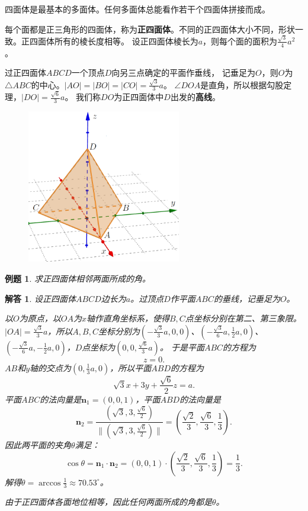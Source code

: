 \documentclass[12pt,UTF8]{ctexbook}
\newtheorem{et}{例题}[section]
\newtheorem*{so}{解答}
\begin{document}
四面体是最基本的多面体。任何多面体总能看作若干个四面体拼接而成。

每个面都是正三角形的四面体，称为\textbf{正四面体}。不同的正四面体大小不同，形状一致。正四面体所有的棱长度相等。
设正四面体棱长为$a$，则每个面的面积为$\frac{\sqrt{3}}{4}a^2$。

过正四面体$ABCD$一个顶点$D$向另三点确定的平面作垂线，
记垂足为$O$，则$O$为$\triangle ABC$的中心。$|AO|=|BO|=|CO|=\frac{\sqrt{3}}{3}a$。
$\angle DOA$是直角，所以根据勾股定理，$|DO| = \frac{\sqrt{6}}{3}a$。
我们称$DO$为正四面体中$D$出发的\textbf{高线}。

\begin{figure}[h] 
    \centering
    \includegraphics[width=0.6\textwidth]{tu/正四面体2.png}
\end{figure}

\begin{et}
    求正四面体相邻两面所成的角。
\end{et}
\begin{so}
    设正四面体$ABCD$边长为$a$。过顶点$D$作平面$ABC$的垂线，记垂足为$O$。
    
    以$O$为原点，以$OA$为$x$轴作直角坐标系，使得$B,C$点坐标分别在第二、第三象限。
    $|OA|=\frac{\sqrt{3}}{3}a$，所以$A,B,C$坐标分别为$(-\frac{\sqrt{3}}{3}a, 0, 0)$、$(-\frac{\sqrt{3}}{6}a, \frac{1}{2}a, 0)$、
    $(-\frac{\sqrt{3}}{6}a, -\frac{1}{2}a, 0)$，$D$点坐标为$(0,0,\frac{\sqrt{6}}{3}a)$。
    于是平面$ABC$的方程为
    $$z=0.$$
    $AB$和$y$轴的交点为$(0,\frac{1}{3}a,0)$，所以平面$ABD$的方程为
    $$\sqrt{3}x + 3y + \frac{\sqrt{6}}{2}z = a.$$
    平面$ABC$的法向量是$\mathbf{n}_1 = (0,0,1)$，平面$ABD$的法向量是
    $$\mathbf{n}_2 = \frac{(\sqrt{3}, 3, \frac{\sqrt{6}}{2})}{\|(\sqrt{3}, 3, \frac{\sqrt{6}}{2})\|} = (\frac{\sqrt{2}}{3}, \frac{\sqrt{6}}{3}, \frac{1}{3}).$$
    因此两平面的夹角$\theta$满足：
    $$ \cos{\theta} = \mathbf{n}_1\cdot \mathbf{n}_2 = (0,0,1)\cdot(\frac{\sqrt{2}}{3}, \frac{\sqrt{6}}{3}, \frac{1}{3}) = \frac{1}{3}.$$
    解得$\theta = \arccos{\frac{1}{3}} \approx 70.53^\circ$。

    由于正四面体各面地位相等，因此任何两面所成的角都是$\theta$。
\end{so}
\end{document}
